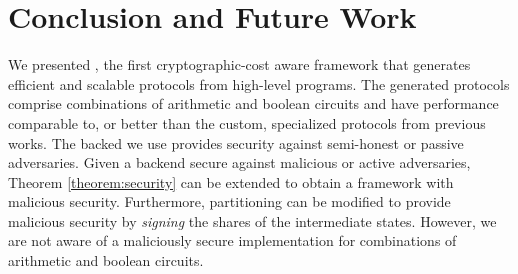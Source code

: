\section{Conclusion and Future Work}
\label{sec:conclude}
We presented \tool, the first
cryptographic-cost aware framework that generates efficient and
scalable \mpc protocols from high-level programs.
The generated protocols comprise combinations
of arithmetic and boolean circuits and have performance comparable to, or better than the custom, specialized
protocols from previous works.
The \mpc backed we use provides security against semi-honest or passive adversaries.
Given a \mpc backend secure against malicious or active adversaries, Theorem \ref{theorem:security} 
can be extended to obtain a framework with malicious security. Furthermore,  
partitioning can be modified to provide malicious security by {\it signing} the shares of the intermediate states. However, we are not aware of a maliciously secure \mpc implementation for combinations of
arithmetic and boolean circuits.






